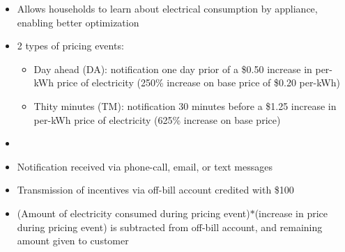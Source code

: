 \documentclass[12pt]{article}
\begin{document}
\begin{itemize}
    \item Allows households to learn about electrical consumption by appliance, enabling better optimization
    \item 2 types of pricing events:
        \begin{itemize}
            \item Day ahead (DA): notification one day prior of a \$0.50 increase in per-kWh price of electricity (250\% increase on base price of \$0.20 per-kWh)
            \item Thity minutes (TM): notification 30 minutes before a \$1.25 increase in per-kWh price of electricity (625\% increase on base price)
        \end{itemize}
    \item {}
    \item Notification received via phone-call, email, or text messages
    \item Transmission of incentives via off-bill account credited with \$100
    \item (Amount of electricity consumed during pricing event)$*$(increase in price during pricing event) is subtracted from off-bill account, and remaining amount given to customer
\end{itemize}
\end{document}
